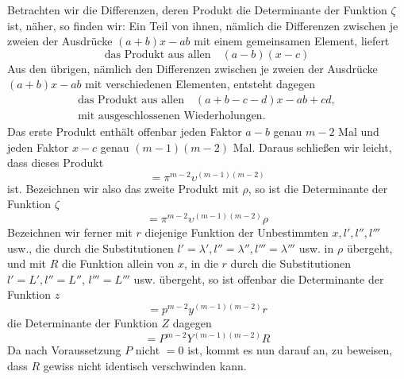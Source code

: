 Betrachten wir die Differenzen, deren Produkt die Determinante der Funktion $\zeta$ ist, näher, so finden wir: Ein Teil von ihnen, nämlich die Differenzen zwischen je zweien der Ausdrücke $(a+b)x-ab$ mit einem gemeinsamen Element, liefert
\[
\text{das Produkt aus allen}\quad(a-b)(x-c)
\]
Aus den übrigen, nämlich den Differenzen zwischen je zweien der Ausdrücke $(a+b)x-ab$ mit verschiedenen Elementen, entsteht dagegen
\[
\begin{gathered}\text{das Produkt aus allen}\quad(a+b-c-d)x-ab+cd,\\\text{mit ausgeschlossenen Wiederholungen.}\end{gathered}
\]
Das erste Produkt enthält offenbar jeden Faktor $a-b$ genau $m-2$ Mal und jeden Faktor $x-c$ genau $(m-1)(m-2)$ Mal. Daraus schließen wir leicht, dass dieses Produkt
\[
=\pi^{m-2}\upsilon^{(m-1)(m-2)}
\]
ist. Bezeichnen wir also das zweite Produkt mit $\rho$, so ist die Determinante der Funktion $\zeta$
\[
=\pi^{m-2}\upsilon^{(m-1)(m-2)}\rho
\]
Bezeichnen wir ferner mit $r$ diejenige Funktion der Unbestimmten $x,l',l'',l'''$ usw., die durch die Substitutionen $l'=\lambda',l''=\lambda'',l'''=\lambda'''$ usw. in $\rho$ übergeht, und mit $R$
die Funktion allein von $x$, in die $r$ durch die Substitutionen $l'=L',l''=L''$, $l'''=L'''$ usw. übergeht, so ist offenbar die Determinante der Funktion $z$
\[
=p^{m-2}y^{(m-1)(m-2)}r
\]
die Determinante der Funktion $Z$ dagegen
\[
=P^{m-2}Y^{(m-1)(m-2)}R
\]
Da nach Voraussetzung $P$ nicht $=0$ ist, kommt es nun darauf an, zu beweisen, dass $R$ gewiss nicht identisch verschwinden kann.

